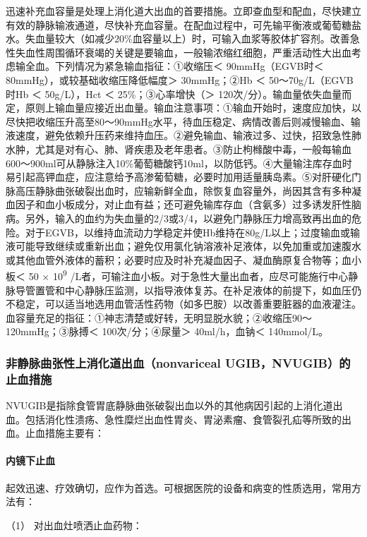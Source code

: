 迅速补充血容量是处理上消化道大出血的首要措施。立即查血型和配血，尽快建立有效的静脉输液通道，尽快补充血容量。在配血过程中，可先输平衡液或葡萄糖盐水。失血量较大（如减少20\%血容量以上）时，可输入血浆等胶体扩容剂。改善急性失血性周围循环衰竭的关键是要输血，一般输浓缩红细胞，严重活动性大出血考虑输全血。下列情况为紧急输血指征：①收缩压＜
90mmHg（EGVB时＜ 80mmHg），或较基础收缩压降低幅度＞ 30mmHg；②Hb ＜
50～70g/L（EGVB时Hb ＜ 50g/L），Hct ＜ 25\%；③心率增快（＞
120次/分）。输血量依失血量而定，原则上输血量应接近出血量。输血注意事项：①输血开始时，速度应加快，以尽快把收缩压升高至80～90mmHg水平，待血压稳定、病情改善后则减慢输血、输液速度，避免依赖升压药来维持血压。②避免输血、输液过多、过快，招致急性肺水肿，尤其是对有心、肺、肾疾患及老年患者。③防止枸橼酸中毒，一般每输血600～900ml可从静脉注入10\%葡萄糖酸钙10ml，以防低钙。④大量输注库存血时易引起高钾血症，应注意给予高渗葡萄糖，必要时加用适量胰岛素。⑤对肝硬化门脉高压静脉曲张破裂出血时，应输新鲜全血，除恢复血容量外，尚因其含有多种凝血因子和血小板成分，对止血有益；还可避免输库存血（含氨多）过多诱发肝性脑病。另外，输入的血约为失血量的2/3或3/4，以避免门静脉压力增高致再出血的危险。对于EGVB，以维持血流动力学稳定并使Hb维持在80g/L以上；过度输血或输液可能导致继续或重新出血；避免仅用氯化钠溶液补足液体，以免加重或加速腹水或其他血管外液体的蓄积；必要时应及时补充凝血因子、凝血酶原复合物等；血小板＜
50 × 10\textsuperscript{9}
/L者，可输注血小板。对于急性大量出血者，应尽可能施行中心静脉导管置管和中心静脉压监测，以指导液体复苏。在补足液体的前提下，如血压仍不稳定，可以适当地选用血管活性药物（如多巴胺）以改善重要脏器的血液灌注。血容量充足的指征：①神志清楚或好转，无明显脱水貌；②收缩压90～120mmHg；③脉搏＜
100次/分；④尿量＞ 40ml/h，血钠＜ 140mmol/L。

\subsubsection{非静脉曲张性上消化道出血（nonvariceal UGIB，NVUGIB）的止血措施}

NVUGIB是指除食管胃底静脉曲张破裂出血以外的其他病因引起的上消化道出血。包括消化性溃疡、急性糜烂出血性胃炎、胃泌素瘤、食管裂孔疝等所致的出血。止血措施主要有：

\paragraph{内镜下止血}

起效迅速、疗效确切，应作为首选。可根据医院的设备和病变的性质选用，常用方法有：

\hypertarget{text00032.htmlux5cux23CHP1-13-1-5-3-1-1}{}
（1） 对出血灶喷洒止血药物：

